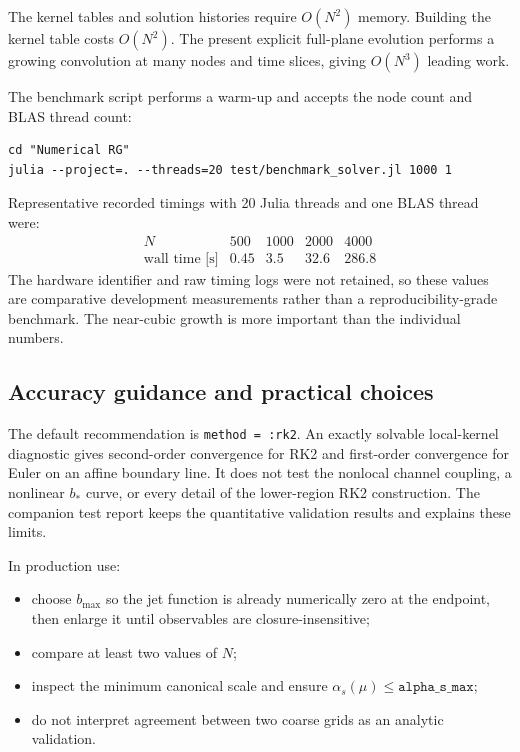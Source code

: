 The kernel tables and solution histories require \(O(N^2)\) memory. Building
the kernel table costs \(O(N^2)\). The present explicit full-plane evolution
performs a growing convolution at many nodes and time slices, giving
\(O(N^3)\) leading work.

The benchmark script performs a warm-up and accepts the node count and BLAS
thread count:
\begin{lstlisting}
cd "Numerical RG"
julia --project=. --threads=20 test/benchmark_solver.jl 1000 1
\end{lstlisting}
Representative recorded timings with 20 Julia threads and one BLAS thread
were:
\begin{equation}
\begin{array}{c|rrrr}
N & 500 & 1000 & 2000 & 4000\\
\hline
\text{wall time [s]} & 0.45 & 3.5 & 32.6 & 286.8
\end{array}
\label{eq:timings}
\end{equation}
The hardware identifier and raw timing logs were not retained, so these values
are comparative development measurements rather than a reproducibility-grade
benchmark. The near-cubic growth is more important than the individual
numbers.

\subsection{Accuracy guidance and practical choices}

The default recommendation is \texttt{method = :rk2}. An exactly solvable
local-kernel diagnostic gives second-order convergence for RK2 and first-order
convergence for Euler on an affine boundary line. It does not test the
nonlocal channel coupling, a nonlinear \(b_*\) curve, or every detail of the
lower-region RK2 construction. The companion test report keeps the
quantitative validation results and explains these limits.

In production use:
\begin{itemize}[leftmargin=1.5em]
  \item choose \(b_{\max}\) so the jet function is already numerically zero at
  the endpoint, then enlarge it until observables are closure-insensitive;
  \item compare at least two values of \(N\);
  \item inspect the minimum canonical scale and ensure
  \(\alpha_s(\mu)\le\texttt{alpha\_s\_max}\);
  \item do not interpret agreement between two coarse grids as an analytic
  validation.
\end{itemize}

